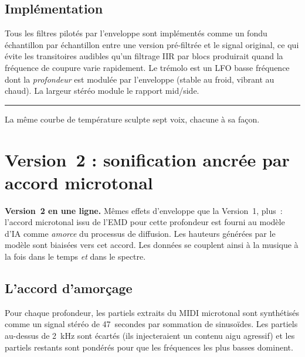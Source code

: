 \documentclass[11pt, a4paper]{article}
\newcommand{\pullquote}[1]{%
  \begin{center}\vspace{0.3em}%
  \begin{minipage}{0.86\textwidth}%
    \color{quoteleft}\sffamily\itshape\large%
    \rule[-0.4em]{2pt}{1.4em}\hspace{0.6em}#1%
  \end{minipage}\vspace{0.3em}\end{center}}
\begin{document}
\subsection{Implémentation}

Tous les filtres pilotés par l'enveloppe sont implémentés comme un fondu
échantillon par échantillon entre une version pré-filtrée et le signal
original, ce qui évite les transitoires audibles qu'un filtrage IIR
par blocs produirait quand la fréquence de coupure varie rapidement. Le
trémolo est un LFO basse fréquence dont la \emph{profondeur} est modulée
par l'enveloppe (stable au froid, vibrant au chaud). La largeur stéréo
module le rapport mid/side.

\pullquote{La même courbe de température sculpte sept voix, chacune à sa façon.}

\section{Version~2 : sonification ancrée par accord microtonal}
\label{sec:v2}

\begin{tcolorbox}[v2box]
\textbf{Version~2 en une ligne.}\enspace
Mêmes effets d'enveloppe que la Version~1, plus~: l'accord microtonal
issu de l'EMD pour cette profondeur est fourni au modèle d'IA comme
\emph{amorce} du processus de diffusion. Les hauteurs générées par le
modèle sont biaisées vers cet accord. Les données se couplent ainsi à la
musique à la fois dans le temps \emph{et} dans le spectre.
\end{tcolorbox}

\subsection{L'accord d'amorçage}

Pour chaque profondeur, les partiels extraits du MIDI microtonal sont
synthétisés comme un signal stéréo de 47~secondes par sommation de
sinusoïdes. Les partiels au-dessus de 2~kHz sont écartés (ils injecteraient
un contenu aigu agressif) et les partiels restants sont pondérés pour que
les fréquences les plus basses dominent.
\end{document}
